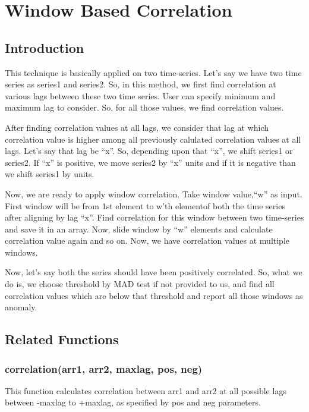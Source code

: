 \chapter{Window Based Correlation}

\section{Introduction}

This technique is basically applied on two time-series. Let's say we have two 
time series as series1 and series2. So, in this method, we first find 
correlation at various lags between these two time series. User can specify 
minimum and maximum lag to consider. So, for all those values, we find 
correlation values. 

After finding correlation values at all lags, we consider that lag at which 
correlation value is higher among all previously calulated correlation values 
at all lags. Let's say that lag be ``x''. So, depending upon that ``x'', we 
shift series1 or series2. If ``x'' is positive, we move series2 by ``x'' units 
and if it is negative than we shift series1 by  units.

Now, we are ready to apply window correlation. Take window value,``w'' as 
input. First window will be from 1st element to w'th elementof both the time 
series after aligning by lag ``x''. Find correlation for this window between 
two time-series and save it in an array. Now, slide window by ``w'' elements 
and 
calculate correlation value again and so on. Now, we have correlation values at 
multiple windows.

Now, let's say both the series should have been positively correlated. So, what 
we do is, we choose threshold by MAD test if not provided to us, and find all 
correlation values which are below that threshold and report all those windows 
as anomaly.

\section{Related Functions}

\subsection{correlation(arr1, arr2, maxlag, pos, neg)}

This function calculates correlation between arr1 and arr2 at all possible lags 
between -maxlag to +maxlag, as specified by pos and neg parameters.

